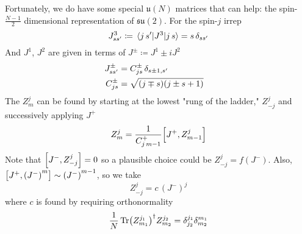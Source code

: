   Fortunately, we do have some special $\mathfrak{u}(N)$ matrices that can help: the spin-$\frac{N-1}{2}$ dimensional representation of $\mathfrak{su}(2)$. For the spin-$j$ irrep
  \begin{equation}
    J^{3}_{s s'} \coloneqq \mel{j\,s'}{J^3}{j\,s} = s \, \delta_{s s'}
  \end{equation}
  And $J^{1}$, $J^2$ are given in terms of $J^{\pm} \coloneqq J^1 \pm i J^2$
  \begin{align}
    J^\pm_{s s'} &= C^{\pm}_{j s} \, \delta_{s \pm 1, s'} \cr
    C^{\pm}_{j s} &= \sqrt{(j \mp s)(j \pm s + 1)}
  \end{align}
  The $Z^j_m$ can be found by starting at the lowest "rung of the ladder," $Z^j_{-j}$ and successively applying $J^+$
  \begin{equation}
    Z^j_m = \frac{1}{C^{+}_{j \, m-1}} \comm{J^+}{Z^j_{m-1}}
  \end{equation}
  Note that $\comm{J^-}{Z^j_{-j}} = 0$ so a plausible choice could be $Z^j_{-j} = f(J^-)$. Also, $\comm{J^+}{{(J^-)}^m} \sim {(J^-)}^{m-1}$, so we take
  \begin{equation}
    Z^j_{-j} = c \, {(J^-)}^{j}
  \end{equation}
  where $c$ is found by requiring orthonormality
  \begin{equation}
    \frac{1}{N} \Tr ({Z^{j_1}_{m_1}})^{\dagger} Z^{j_2}_{m_2} = \delta^{j_1}_{j_2} \delta^{m_1}_{m_2}
  \end{equation}